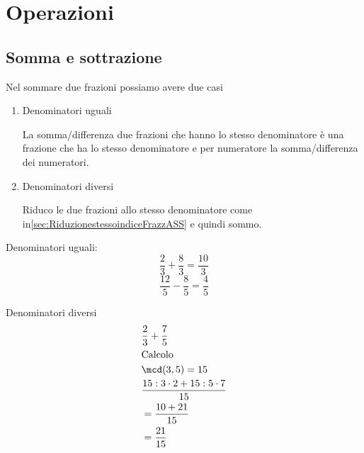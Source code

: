 \section{Operazioni}
	\label{sec:OperazioniASS}
	\subsection{Somma e sottrazione}
	\label{ssec:SommaesottrazioniASS}
	Nel sommare due frazioni possiamo avere due casi 
	\begin{enumerate}
		\item Denominatori uguali
		
		La somma/differenza due frazioni che hanno lo stesso denominatore è una frazione che ha lo stesso denominatore e per numeratore la somma/differenza dei numeratori. 
		\item Denominatori diversi
		
		Riduco le due frazioni allo stesso denominatore come in\nobs\vref{sec:RiduzionestessoindiceFrazzASS} e quindi sommo.
	\end{enumerate}
	\begin{esempio}
		Denominatori uguali:
		\[\dfrac{2}{3}+\dfrac{8}{3}=\dfrac{10}{3}\]  \[\dfrac{12}{5}-\dfrac{8}{5}=\dfrac{4}{5}\]
	\end{esempio}
	\begin{esempio}
		Denominatori diversi
		\begin{align*}
			&\dfrac{2}{3}+\dfrac{7}{5}\\
			&\text{Calcolo}\\
			&\mcd(3,5)=15\\
			&\dfrac{15:3\cdot 2+15:5\cdot 7}{15}\\
			&=\dfrac{10+21}{15}\\
			&=\dfrac{21}{15}
			\end{align*}
	\end{esempio}
